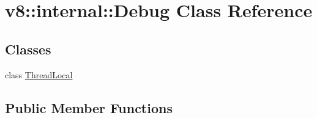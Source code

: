 \hypertarget{classv8_1_1internal_1_1_debug}{}\section{v8\+:\+:internal\+:\+:Debug Class Reference}
\label{classv8_1_1internal_1_1_debug}
\subsection*{Classes}
\begin{DoxyCompactItemize}
\item 
class \hyperlink{classv8_1_1internal_1_1_debug_1_1_thread_local}{Thread\+Local}
\end{DoxyCompactItemize}
\subsection*{Public Member Functions}
